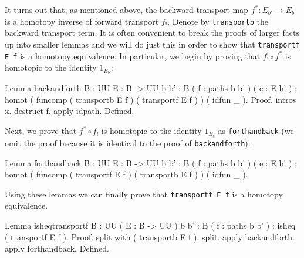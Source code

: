 It turns out that, as mentioned above, the backward transport map
$f^{*}:E_{b'}\to E_{b}$ is a homotopy inverse of forward transport
$f_{!}$.  Denote by \verb|transportb| the backward transport
term.  It is often convenient to break the proofs of larger facts up
into smaller lemmas and we will do just this in order to show that
\verb|transportf E f| is a homotopy equivalence.  In particular,
we begin by proving that $f_{!}\circ f^{*}$ is homotopic to the
identity $1_{E_{b'}}$:
\begin{center}
  \begin{coqcode}
Lemma backandforth { B : UU } { E : B -> UU } { b b' : B } ( f : paths b b' ) ( e : E b' ) : homot ( funcomp ( transportb E f ) ( transportf E f ) ) ( idfun _ ).
Proof.
  intros x. destruct f. apply idpath. 
Defined.
  \end{coqcode}
\end{center}
Next, we prove that $f^{*}\circ f_{!}$ is homotopic to the identity
$1_{E_{b}}$ as \verb|forthandback| (we omit the proof because it
is identical to the proof of \verb|backandforth|):
\begin{center}
  \begin{coqcode}
Lemma forthandback { B : UU } { E : B -> UU } { b b' : B } ( f : paths b b' ) ( e : E b' ) : homot ( funcomp ( transportf E f ) ( transportb E f ) ) ( idfun _ ).
  \end{coqcode}
\end{center}
Using these lemmas we can finally prove that 
\verb|transportf E f| is a homotopy equivalence.
\begin{center}
  \begin{coqcode}
Lemma isheqtransportf { B : UU } ( E : B -> UU ) { b b' : B } ( f : paths b b' ) : isheq ( transportf E f ).
Proof.
  split with ( transportb E f ). split.
  apply backandforth. apply forthandback.
Defined.
  \end{coqcode}
\end{center}
